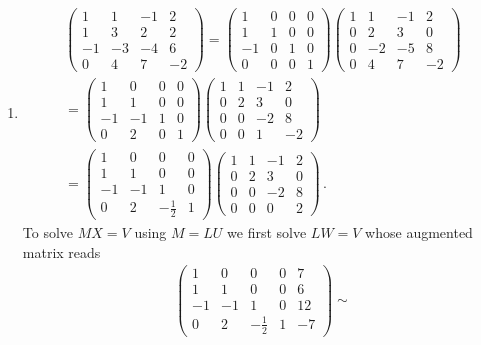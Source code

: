 \begin{enumerate}
\item
\begin{gather*}
\begin{pmatrix}
1&1&-1&2\\
1&3&2&2\\
-1&-3&-4&6\\
0&4&7&-2
\end{pmatrix}
=
\begin{pmatrix}
1&0&0&0\\
1&1&0&0\\
-1&0&1&0\\
0&0&0&1
\end{pmatrix}
\begin{pmatrix}
1&1&-1&2\\
0&2&3&0\\
0&-2&-5&8\\
0&4&7&-2
\end{pmatrix}
\\
=
\begin{pmatrix}
1&0&0&0\\
1&1&0&0\\
-1&-1&1&0\\
0&2&0&1
\end{pmatrix}
\begin{pmatrix}
1&1&-1&2\\
0&2&3&0\\
0&0&-2&8\\
0&0&1&-2
\end{pmatrix}
\\=
\begin{pmatrix}
1&0&0&0\\
1&1&0&0\\
-1&-1&1&0\\
0&2&-\frac12&1
\end{pmatrix}
\begin{pmatrix}
1&1&-1&2\\
0&2&3&0\\
0&0&-2&8\\
0&0&0&2
\end{pmatrix}\, .
\end{gather*}
To solve $MX=V$ using $M=LU$ we first solve $LW=V$ whose augmented matrix reads
\begin{gather*}
\left(
\begin{array}{cccc|c}
1&0&0&0&7\\
1&1&0&0&6\\
-1&-1&1&0&12\\
0&2&-\frac12&1&-7
\end{array}\right)
\sim 

\end{gather*}
\end{enumerate}
